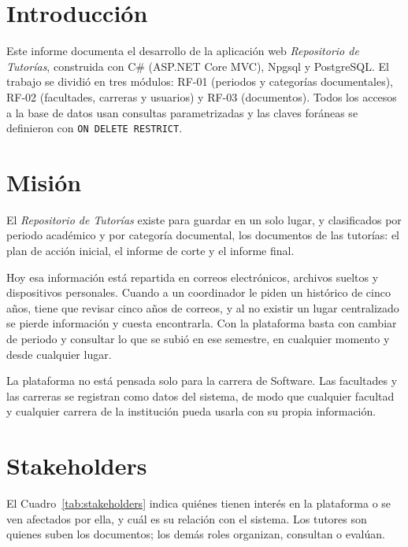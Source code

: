 \documentclass[12pt,a4paper,oneside]{article}
\begin{document}
\section{Introducción}
Este informe documenta el desarrollo de la aplicación web \textit{Repositorio de Tutorías}, construida con C\# (ASP.NET Core MVC), Npgsql y PostgreSQL. El trabajo se dividió en tres módulos: RF-01 (periodos y categorías documentales), RF-02 (facultades, carreras y usuarios) y RF-03 (documentos). Todos los accesos a la base de datos usan consultas parametrizadas y las claves foráneas se definieron con \texttt{ON DELETE RESTRICT}.
\section{Misión}

El \textit{Repositorio de Tutorías} existe para guardar en un solo lugar, y clasificados
por periodo académico y por categoría documental, los documentos de las tutorías: el plan
de acción inicial, el informe de corte y el informe final.

Hoy esa información está repartida en correos electrónicos, archivos sueltos y
dispositivos personales. Cuando a un coordinador le piden un histórico de cinco años,
tiene que revisar cinco años de correos, y al no existir un lugar centralizado se pierde
información y cuesta encontrarla. Con la plataforma basta con cambiar de periodo y
consultar lo que se subió en ese semestre, en cualquier momento y desde cualquier lugar.

La plataforma no está pensada solo para la carrera de Software. Las facultades y las
carreras se registran como datos del sistema, de modo que cualquier facultad y cualquier
carrera de la institución pueda usarla con su propia información.

\section{Stakeholders}

El Cuadro~\ref{tab:stakeholders} indica quiénes tienen interés en la plataforma o se ven
afectados por ella, y cuál es su relación con el sistema. Los tutores son quienes suben
los documentos; los demás roles organizan, consultan o evalúan.
\end{document}
